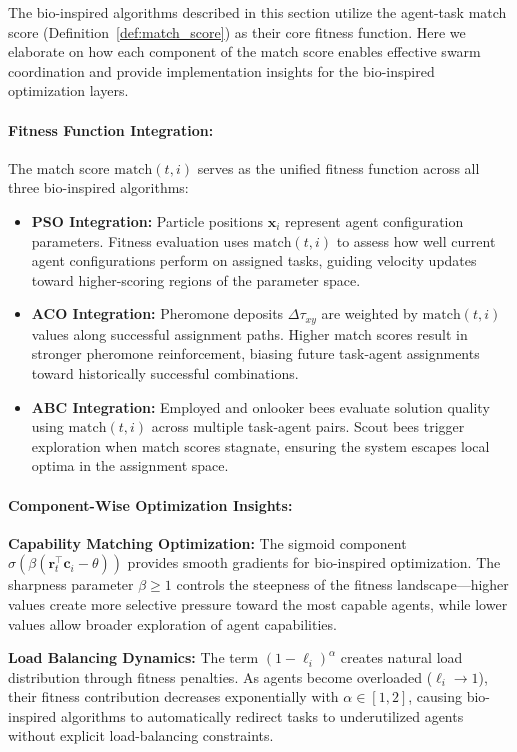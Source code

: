 \documentclass{article}
\begin{document}
The bio-inspired algorithms described in this section utilize the agent-task match score (Definition~\ref{def:match_score}) as their core fitness function. Here we elaborate on how each component of the match score enables effective swarm coordination and provide implementation insights for the bio-inspired optimization layers.

\paragraph{Fitness Function Integration:} The match score $\text{match}(t,i)$ serves as the unified fitness function across all three bio-inspired algorithms:
\begin{itemize}
\item \textbf{PSO Integration:} Particle positions $\mathbf{x}_i$ represent agent configuration parameters. Fitness evaluation uses $\text{match}(t,i)$ to assess how well current agent configurations perform on assigned tasks, guiding velocity updates toward higher-scoring regions of the parameter space.
\item \textbf{ACO Integration:} Pheromone deposits $\Delta\tau_{xy}$ are weighted by $\text{match}(t,i)$ values along successful assignment paths. Higher match scores result in stronger pheromone reinforcement, biasing future task-agent assignments toward historically successful combinations.
\item \textbf{ABC Integration:} Employed and onlooker bees evaluate solution quality using $\text{match}(t,i)$ across multiple task-agent pairs. Scout bees trigger exploration when match scores stagnate, ensuring the system escapes local optima in the assignment space.
\end{itemize}

\paragraph{Component-Wise Optimization Insights:}

\textbf{Capability Matching Optimization:} The sigmoid component $\sigma(\beta(\mathbf{r}_t^\top \mathbf{c}_i - \theta))$ provides smooth gradients for bio-inspired optimization. The sharpness parameter $\beta \geq 1$ controls the steepness of the fitness landscape—higher values create more selective pressure toward the most capable agents, while lower values allow broader exploration of agent capabilities.

\textbf{Load Balancing Dynamics:} The term $(1-\ell_i)^\alpha$ creates natural load distribution through fitness penalties. As agents become overloaded ($\ell_i \to 1$), their fitness contribution decreases exponentially with $\alpha \in [1,2]$, causing bio-inspired algorithms to automatically redirect tasks to underutilized agents without explicit load-balancing constraints.
\end{document}
